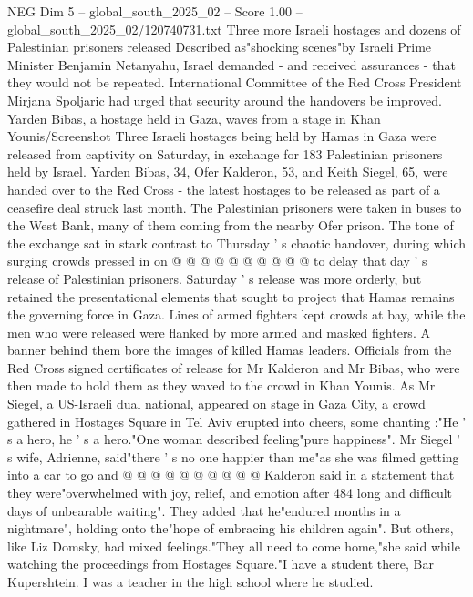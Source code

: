 \begin{textsample}{NEG Dim 5 – global\_south\_2025\_02 – Score 1.00 – global\_south\_2025\_02/120740731.txt}  \label{ex:f5_neg_307}
Three more Israeli hostages and dozens of Palestinian prisoners released Described as"shocking scenes"by Israeli Prime Minister Benjamin Netanyahu, Israel demanded - and received assurances - that they would not be repeated.
International Committee of the Red Cross President Mirjana Spoljaric had urged that security around the handovers be improved.
Yarden Bibas, a hostage held in Gaza, waves from a stage in Khan Younis/Screenshot Three Israeli hostages being held by Hamas in Gaza were released from captivity on Saturday, in exchange for 183 Palestinian prisoners held by Israel.
Yarden Bibas, 34, Ofer Kalderon, 53, and Keith Siegel, 65, were handed over to the Red Cross - the latest hostages to be released as part of a ceasefire deal struck last month.
The Palestinian prisoners were taken in buses to the West Bank, many of them coming from the nearby Ofer prison.
The tone of the exchange sat in stark contrast to Thursday ' s chaotic handover, during which surging crowds pressed in on @ @ @ @ @ @ @ @ @ @ to delay that day ' s release of Palestinian prisoners.
Saturday ' s release was more orderly, but retained the presentational elements that sought to project that Hamas remains the governing force in Gaza.
Lines of armed fighters kept crowds at bay, while the men who were released were flanked by more armed and masked fighters.
A banner behind them bore the images of killed Hamas leaders.
Officials from the Red Cross signed certificates of release for Mr Kalderon and Mr Bibas, who were then made to hold them as they waved to the crowd in Khan Younis.
As Mr Siegel, a US-Israeli dual national, appeared on stage in Gaza City, a crowd gathered in Hostages Square in Tel Aviv erupted into cheers, some chanting :"He ' s a hero, he ' s a hero."One woman described feeling"pure happiness".
Mr Siegel ' s wife, Adrienne, said"there ' s no one happier than me"as she was filmed getting into a car to go and @ @ @ @ @ @ @ @ @ @ Kalderon said in a statement that they were"overwhelmed with joy, relief, and emotion after 484 long and difficult days of unbearable waiting".
They added that he"endured months in a nightmare", holding onto the"hope of embracing his children again".
But others, like Liz Domsky, had mixed feelings."They all need to come home,"she said while watching the proceedings from Hostages Square."I have a student there, Bar Kupershtein.
I was a teacher in the high school where he studied.

\end{textsample}
